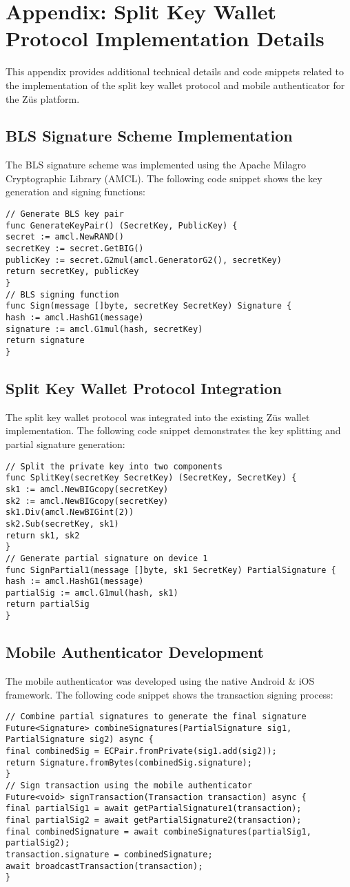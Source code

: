 \chapter*{Appendix: Split Key Wallet Protocol Implementation Details}
\label{AppendixA}
This appendix provides additional technical details and code snippets related to the implementation of the split key wallet protocol and mobile authenticator for the Züs platform.
\section*{BLS Signature Scheme Implementation}
The BLS signature scheme was implemented using the Apache Milagro Cryptographic Library (AMCL). The following code snippet shows the key generation and signing functions:
\begin{verbatim}
// Generate BLS key pair
func GenerateKeyPair() (SecretKey, PublicKey) {
secret := amcl.NewRAND()
secretKey := secret.GetBIG()
publicKey := secret.G2mul(amcl.GeneratorG2(), secretKey)
return secretKey, publicKey
}
// BLS signing function
func Sign(message []byte, secretKey SecretKey) Signature {
hash := amcl.HashG1(message)
signature := amcl.G1mul(hash, secretKey)
return signature
}
\end{verbatim}
\section*{Split Key Wallet Protocol Integration}
The split key wallet protocol was integrated into the existing Züs wallet implementation. The following code snippet demonstrates the key splitting and partial signature generation:
\begin{verbatim}
// Split the private key into two components
func SplitKey(secretKey SecretKey) (SecretKey, SecretKey) {
sk1 := amcl.NewBIGcopy(secretKey)
sk2 := amcl.NewBIGcopy(secretKey)
sk1.Div(amcl.NewBIGint(2))
sk2.Sub(secretKey, sk1)
return sk1, sk2
}
// Generate partial signature on device 1
func SignPartial1(message []byte, sk1 SecretKey) PartialSignature {
hash := amcl.HashG1(message)
partialSig := amcl.G1mul(hash, sk1)
return partialSig
}
\end{verbatim}
\section*{Mobile Authenticator Development}
The mobile authenticator was developed using the native Android & iOS framework. The following code snippet shows the transaction signing process:
\begin{verbatim}
// Combine partial signatures to generate the final signature
Future<Signature> combineSignatures(PartialSignature sig1, PartialSignature sig2) async {
final combinedSig = ECPair.fromPrivate(sig1.add(sig2));
return Signature.fromBytes(combinedSig.signature);
}
// Sign transaction using the mobile authenticator
Future<void> signTransaction(Transaction transaction) async {
final partialSig1 = await getPartialSignature1(transaction);
final partialSig2 = await getPartialSignature2(transaction);
final combinedSignature = await combineSignatures(partialSig1, partialSig2);
transaction.signature = combinedSignature;
await broadcastTransaction(transaction);
}
\end{verbatim}
